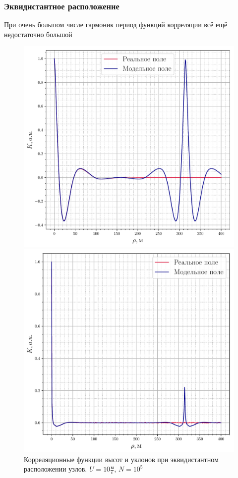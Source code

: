 \documentclass[10pt,pdf,hyperref={unicode}, dvipsnames]{beamer}
\begin{document}
\begin{frame}[t]\frametitle{Эквидистантное расположение}
	При очень большом числе гармоник период функций корреляции всё ещё недостаточно большой
	\begin{figure}[h!]
		\vfill
		\begin{minipage}{0.49\textheight}
				\centering
				\includegraphics[width=\linewidth]{fig/correlation_height5_slopes2.pdf}
		\end{minipage}
		\hfill
		\begin{minipage}{0.49\linewidth}
				\centering
				\includegraphics[scale=0.26]{fig/correlation_angles5_slopes2.pdf}
		\end{minipage}
		\caption{Корреляционные функции высот и уклонов при эквидистантном расположении узлов. $U=10 \frac{\text{м}}{\text{c}}$, $N=10^5$}
		\label{fig:ca05}		



\end{figure}
\end{frame}
\end{document}
